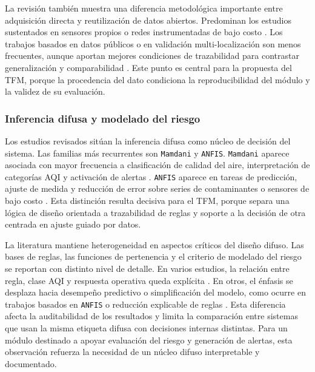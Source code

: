 La revisión también muestra una diferencia metodológica importante entre adquisición directa y reutilización de datos abiertos. Predominan los estudios sustentados en sensores propios o redes instrumentadas de bajo costo \cite{ART05,ART06,A114,A165,A167}. Los trabajos basados en datos públicos o en validación multi-localización son menos frecuentes, aunque aportan mejores condiciones de trazabilidad para contrastar generalización y comparabilidad \cite{A028,A084,A135}. Este punto es central para la propuesta del TFM, porque la procedencia del dato condiciona la reproducibilidad del módulo y la validez de su evaluación.

\subsubsection{Inferencia difusa y modelado del riesgo}
Los estudios revisados sitúan la inferencia difusa como núcleo de decisión del sistema. Las familias más recurrentes son \texttt{Mamdani} y \texttt{ANFIS}. \texttt{Mamdani} aparece asociada con mayor frecuencia a clasificación de calidad del aire, interpretación de categorías AQI y activación de alertas \cite{ART06,A165,A167}. \texttt{ANFIS} aparece en tareas de predicción, ajuste de medida y reducción de error sobre series de contaminantes o sensores de bajo costo \cite{A028,A084,A135}. Esta distinción resulta decisiva para el TFM, porque separa una lógica de diseño orientada a trazabilidad de reglas y soporte a la decisión de otra centrada en ajuste guiado por datos.

La literatura mantiene heterogeneidad en aspectos críticos del diseño difuso. Las bases de reglas, las funciones de pertenencia y el criterio de modelado del riesgo se reportan con distinto nivel de detalle. En varios estudios, la relación entre regla, clase AQI y respuesta operativa queda explícita \cite{ART05,ART06,A114,A165,A167}. En otros, el énfasis se desplaza hacia desempeño predictivo o simplificación del modelo, como ocurre en trabajos basados en \texttt{ANFIS} o reducción explicable de reglas \cite{A028,A084}. Esta diferencia afecta la auditabilidad de los resultados y limita la comparación entre sistemas que usan la misma etiqueta difusa con decisiones internas distintas. Para un módulo destinado a apoyar evaluación del riesgo y generación de alertas, esta observación refuerza la necesidad de un núcleo difuso interpretable y documentado.

